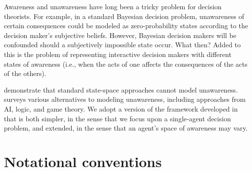 \documentclass[
11pt,
titlepage,
reqno,
]{article}%
\theoremstyle{definition}
\begin{document}
Awareness and unawareness have long been a tricky problem for decision theorists. 
For example, in a standard Bayesian decision problem, unawareness of certain consequences could be modeled as zero-probability states according to the decision maker's subjective beliefs. 
However, Bayesian decision makers will be confounded should a subjectively impossible state occur. 
What then?
Added to this is the problem of representing interactive decision makers with different states of awareness (i.e., when the acts of one affects the consequences of the acts of the others). 

\citet{Dekel1998} demonstrate that standard state-space approaches cannot model unawareness. 
\citet{Schipper2015} surveys various alternatives to modeling unawareness, including approaches from  AI, logic, and game theory. 
We adopt a version of the framework developed in \citet{Heifetz2006} \citep[also see][for related extensions]{Heifetz2008,Heifetz2013} that is both simpler, in the sense that we focus upon a single-agent decision problem, and extended, in the sense that an agent's space of awareness may vary.

	
\section{Notational conventions}
\end{document}
